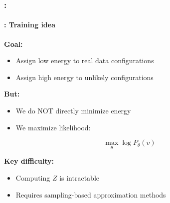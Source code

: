 \documentclass[xcolor=table]{beamer}
\begin{document}
	\begin{frame}
		\frametitle{\insertshortsubtitle: \insertsection}
		\framesubtitle{\insertsubsection: Training idea}
		
		\textbf{Goal:}
		\begin{itemize}
			\item Assign low energy to real data configurations
			\item Assign high energy to unlikely configurations
		\end{itemize}
		
		\vspace{0.5em}
		
		\textbf{But:}
		\begin{itemize}
			\item We do NOT directly minimize energy
			\item We maximize likelihood:
		\end{itemize}
		
		\[
		\max_\theta \log P_\theta(v)
		\]
		
		\vspace{0.5em}
		
		\textbf{Key difficulty:}
		\begin{itemize}
			\item Computing $Z$ is intractable
			\item Requires sampling-based approximation methods
		\end{itemize}
		
	\end{frame}
	
\end{document}
